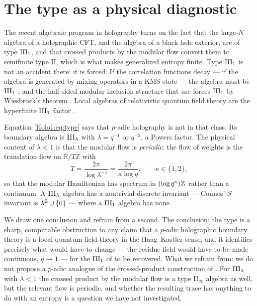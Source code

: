 \section{The type as a physical diagnostic}\label{Holo1:sec:type}

The recent algebraic program in holography \cite{LL1,LL2,Witten22,CPW23,CLPW23} turns on
the fact that the large-$N$ algebra of a holographic CFT, and the algebra of a black hole
exterior, are of type $\mathrm{III}_1$, and that crossed products by the modular flow convert them
to semifinite type $\mathrm{II}$, which is what makes generalized entropy finite. Type
$\mathrm{III}_1$ is not an accident there: it is forced. If the correlation functions decay --- if
the algebra is generated by mixing operators in a KMS state --- the algebra must be
$\mathrm{III}_1$ \cite{FLMO23}; and the half-sided modular inclusion structure that
\cite{LL1,LL2} use forces $\mathrm{III}_1$ by Wiesbrock's theorem \cite{Wiesbrock93}. Local
algebras of relativistic quantum field theory are the hyperfinite $\mathrm{III}_1$ factor
\cite{BDF87}.

Equation \eqref{Holo1:eq:type} says that $p$-adic holography is not in that class. Its boundary
algebra is $\mathrm{III}_\lambda$ with $\lambda=q^{-1}$ or $q^{-2}$, a Powers factor. The physical
content of $\lambda<1$ is that the modular flow is \emph{periodic}: the flow of weights is
the translation flow on $\mathbb R/T\mathbb Z$ with
\[
T=\frac{2\pi}{\log\lambda^{-1}}=\frac{2\pi}{\kappa\log q},\qquad\kappa\in\{1,2\},
\]
so that the modular Hamiltonian has spectrum in $(\log q^{\kappa})\mathbb{Z}$ rather than a
continuum. A $\mathrm{III}_\lambda$ algebra has a nontrivial discrete invariant --- Connes' $S$
invariant is $\lambda^{\mathbb{Z}}\cup\{0\}$ --- where a $\mathrm{III}_1$ algebra has none.

We draw one conclusion and refrain from a second. The conclusion: the type is a sharp,
computable obstruction to any claim that a $p$-adic holographic boundary theory is a local
quantum field theory in the Haag--Kastler sense, and it identifies precisely what would
have to change --- the residue field would have to be made continuous, $q\to1$ --- for the
$\mathrm{III}_1$ of \cite{LL1,Witten22} to be recovered. What we refrain from: we do not propose a
$p$-adic analogue of the crossed-product construction of \cite{Witten22}. For
$\mathrm{III}_\lambda$ with $\lambda<1$ the crossed product by the modular flow is a type
$\mathrm{II}_\infty$ algebra as well, but the relevant flow is periodic, and whether the
resulting trace has anything to do with an entropy is a question we have not investigated.

